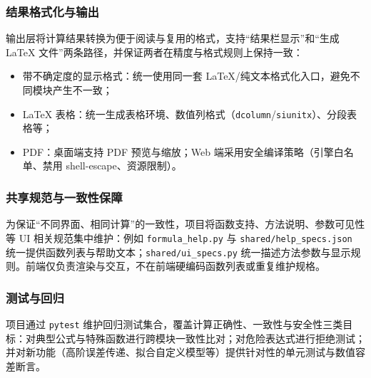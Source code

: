 \documentclass[UTF8,a4paper,11pt]{ctexart}
\begin{document}
\subsubsection{结果格式化与输出}
输出层将计算结果转换为便于阅读与复用的格式，支持“结果栏显示”和“生成 LaTeX 文件”两条路径，并保证两者在精度与格式规则上保持一致：
\begin{itemize}
  \item 带不确定度的显示格式：统一使用同一套 LaTeX/纯文本格式化入口，避免不同模块产生不一致；
  \item LaTeX 表格：统一生成表格环境、数值列格式（\texttt{dcolumn}/\texttt{siunitx}）、分段表格等；
  \item PDF：桌面端支持 PDF 预览与缩放；Web 端采用安全编译策略（引擎白名单、禁用 shell-escape、资源限制）。
\end{itemize}

\subsubsection{共享规范与一致性保障}
为保证“不同界面、相同计算”的一致性，项目将函数支持、方法说明、参数可见性等 UI 相关规范集中维护：例如 \texttt{formula\_help.py} 与 \texttt{shared/help\_specs.json} 统一提供函数列表与帮助文本；\texttt{shared/ui\_specs.py} 统一描述方法参数与显示规则。前端仅负责渲染与交互，不在前端硬编码函数列表或重复维护规格。

\subsubsection{测试与回归}
项目通过 \texttt{pytest} 维护回归测试集合，覆盖计算正确性、一致性与安全性三类目标：对典型公式与特殊函数进行跨模块一致性比对；对危险表达式进行拒绝测试；并对新功能（高阶误差传递、拟合自定义模型等）提供针对性的单元测试与数值容差断言。
\end{document}
